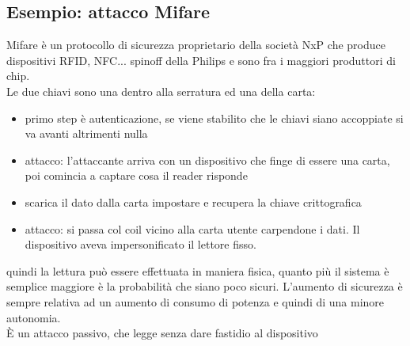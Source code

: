 \documentclass[oneside, 12pt]{extbook}
\begin{document}
\subsection{Esempio: attacco Mifare}
Mifare è un protocollo di sicurezza proprietario della società NxP che produce dispositivi RFID, NFC... spinoff della Philips e sono fra i maggiori produttori di chip.\\Le due chiavi sono una dentro alla serratura ed una della carta:
\begin{itemize}
	\item primo step è autenticazione, se viene stabilito che le chiavi siano accoppiate si va avanti altrimenti nulla
	\item attacco: l'attaccante arriva con un dispositivo che finge di essere una carta, poi comincia a captare cosa il reader risponde 
	\item scarica il dato dalla carta impostare e recupera la chiave crittografica
	\item attacco: si passa col coil vicino alla carta utente carpendone i dati. Il dispositivo aveva impersonificato il lettore fisso.
\end{itemize}
quindi la lettura può essere effettuata in maniera fisica, quanto più il sistema è semplice maggiore è la probabilità che siano poco sicuri. L'aumento di sicurezza è sempre relativa ad un aumento di consumo di potenza e quindi di una minore autonomia.\\È un attacco passivo, che legge senza dare fastidio al dispositivo
\end{document}
